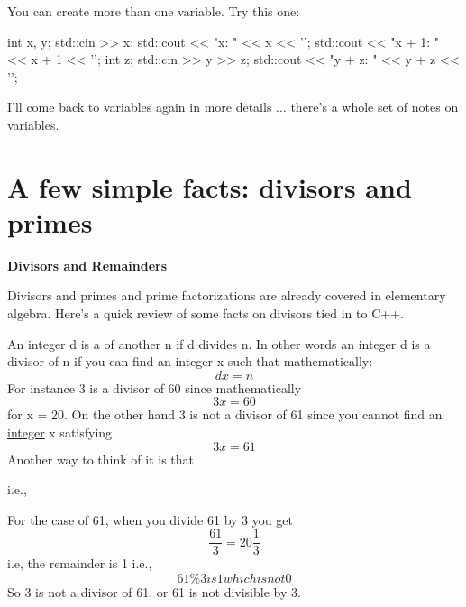 You can create more than one variable. Try this one:
\begin{console}
int x, y;
std::cin >> x;
std::cout << "x: " << x << '\n';
std::cout << "x + 1: " << x + 1 << '\n';
int z;
std::cin >> y >> z;
std::cout << "y + z: " << y + z << '\n';
\end{console}

I'll come back to variables again in more details ... there's a whole set of
notes on variables.

%
%

\newpage\section{A few simple facts: divisors and primes}

\textbf{{Divisors and Remainders}}

Divisors and primes and prime factorizations are already covered in
elementary algebra. Here's a quick review of some facts on divisors tied
in to C++.

An integer d is a  of another n if d divides n. In other words an integer d is a divisor of n if you can find an integer x such that mathematically:
\[dx = n\]
For instance 3 is a divisor of 60 since mathematically
\[3x = 60\]
for x = 20. On the other hand 3 is not a divisor of 61 since you cannot find an \underline{integer} x satisfying
\[3x = 61\]
Another way to think of it is that


i.e.,


For the case of 61, when you divide 61 by 3 you get
\[\frac{61}{3} = 20\frac{1}{3}\]
i.e, the remainder is 1 i.e.,
\[61 \% 3 is 1 which is not 0\]
So 3 is not a divisor of 61, or 61 is not divisible by 3.

%
%
%

